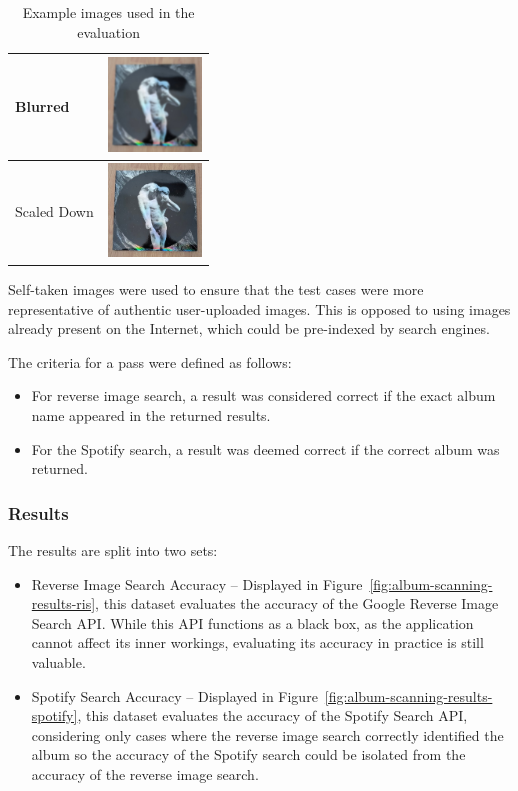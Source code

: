 \begin{table} [H]
\begin{subtable}{0.48\textwidth}
\begin{tabular}{|m{2.5cm}|m{2.5cm}|}
            \hline
            Blurred & \includegraphics[width=2.5cm]{figures/test_albums/Reflektor_Blurred.jpg} \\
            \hline
            Scaled Down & \includegraphics[width=2.5cm]{figures/test_albums/Reflektor_Scaled.jpg} \\
            \hline
        \end{tabular}
    \end{subtable}

    \caption{Example images used in the evaluation}
    \label{tab:image-evaluation-examples}
\end{table}

Self-taken images were used to ensure that the test cases were more representative of authentic user-uploaded images. This is opposed to using images already present on the Internet, which could be pre-indexed by search engines.

The criteria for a pass were defined as follows:
\begin{itemize}
    \item For reverse image search, a result was considered correct if the exact album name appeared in the returned results.
    \item For the Spotify search, a result was deemed correct if the correct album was returned.
\end{itemize}

\subsubsection{Results}
The results are split into two sets:
\begin{itemize}
    \item Reverse Image Search Accuracy – Displayed in Figure~\ref{fig:album-scanning-results-ris}, this dataset evaluates the accuracy of the Google Reverse Image Search API. While this API functions as a black box, as the application cannot affect its inner workings, evaluating its accuracy in practice is still valuable.
    \item Spotify Search Accuracy – Displayed in Figure~\ref{fig:album-scanning-results-spotify}, this dataset evaluates the accuracy of the Spotify Search API, considering only cases where the reverse image search correctly identified the album so the accuracy of the Spotify search could be isolated from the accuracy of the reverse image search.
\end{itemize}

